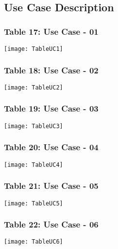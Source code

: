 \begin{figure}[ht]
\subsection{Use Case Description}
\subsubsection{Table 17: Use Case - 01}
\centering
\texttt{[image: TableUC1]}
\end{figure}
\begin{figure}[ht]
\subsubsection{Table 18: Use Case - 02}
\centering
\texttt{[image: TableUC2]}
\end{figure}

\begin{figure}[ht]
\subsubsection{Table 19: Use Case - 03}
\centering
\texttt{[image: TableUC3]}
\end{figure}

\begin{figure}[ht]
\subsubsection{Table 20: Use Case - 04}
\centering
\texttt{[image: TableUC4]}
\end{figure}

\begin{figure}[ht]
\subsubsection{Table 21: Use Case - 05}
\centering
\texttt{[image: TableUC5]}
\end{figure}

\begin{figure}[ht]
\subsubsection{Table 22: Use Case - 06}
\centering
\texttt{[image: TableUC6]}
\end{figure}

